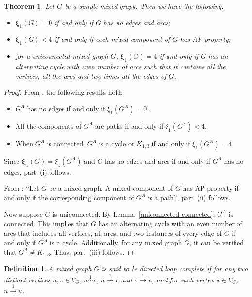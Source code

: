 \documentclass[12pt]{article}
\numberwithin{equation}{section}
\newtheorem{thm}{Theorem}[section]
\newtheorem{defn}{Definition}[section]
\begin{document}
	\begin{thm}
		Let $G$ be a simple mixed graph. Then we have the following.
		\begin{itemize}
			\item[(i)] $\bm{\xi}_1(G)=0$ if and only if $G$ has no edges and arcs;
			\item[(ii)] $\bm{\xi}_1(G)<4$ if and only if each mixed component of $G$ has AP property;
			\item[(iii)] for a uniconnected mixed graph $G$, $\bm{\xi}_1(G)=4$ if and only if $G$ has an alternating cycle with even number of arcs such that it contains all the vertices, all the arcs and two times all the edges of $G$.
		\end{itemize}
	\end{thm}
	\begin{proof}
		From \cite[parts~(i), (ii), (iii) of Proposition~7.8.16]{cvetkovic}, the following results hold:
		\begin{itemize}
	\item $G^A$ has no edges  if and only if $\xi_1(G^A)=0$.
		
		\item All the components of $G^A$ are paths	   if and only if $\xi_1(G^A)<4$. 
		
			\item When $G^A$ is connected, $G^A$ is a cycle or $K_{1,3}$ if and only if $\xi_1(G^A)=4$. 
		\end{itemize}
			
		Since  $\bm{\xi}_1(G)=\xi_1(G^A)$ and $G$ has no edges and arcs if and only if $G^A$ has no edges, part~(i) follows.
		
		From \cite[Lemma~7.2]{Kalaimatrices1}: ``Let $G$ be a mixed graph. A mixed component of $G$ has AP property if and only if the corresponding component of $G^A$ is a path'', part~(ii) follows. 
		
		
	Now	suppose $G$ is uniconnected. By Lemma~\ref{uniconnected connected}, $G^A$ is connected. This implies that $G$ has an alternating cycle with an even number of arcs that includes all vertices, all arcs, and two instances of every edge of $G$ if and only if $G^A$ is a cycle. Additionally, for any mixed graph $G$, it can be verified that  $G^A\neq K_{1,3}$. Thus, part~(iii) follows.
	\end{proof}
	\begin{defn}\normalfont
		A mixed graph $G$ is said to be \textit{directed loop complete} if for any two distinct vertices $u,v\in V_G$, $u\overset{1}{\sim}v$, $u\overset{1}{\rightarrow}v$ and $v\overset{1}{\rightarrow}u$, and for each vertex $u\in V_G$, $u\overset{1}{\rightarrow}u$.
	\end{defn}
\end{document}

